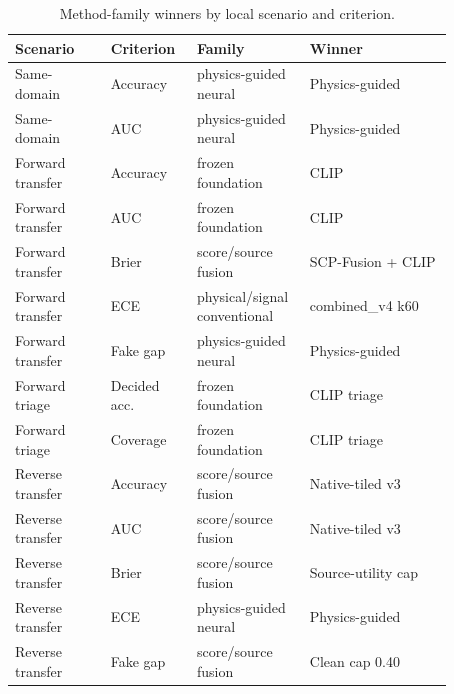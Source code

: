 \begin{table}[t]
\centering
\small
\caption{Method-family winners by local scenario and criterion.}
\label{tab:method-family-comparison}
\begin{tabular}{p{0.20\linewidth} p{0.18\linewidth} p{0.19\linewidth} p{0.30\linewidth}}
\toprule
Scenario & Criterion & Family & Winner \\
\midrule
Same-domain & Accuracy & physics-guided neural & Physics-guided \\
Same-domain & AUC & physics-guided neural & Physics-guided \\
Forward transfer & Accuracy & frozen foundation & CLIP \\
Forward transfer & AUC & frozen foundation & CLIP \\
Forward transfer & Brier & score/source fusion & SCP-Fusion + CLIP \\
Forward transfer & ECE & physical/signal conventional & combined\_v4 k60 \\
Forward transfer & Fake gap & physics-guided neural & Physics-guided \\
Forward triage & Decided acc. & frozen foundation & CLIP triage \\
Forward triage & Coverage & frozen foundation & CLIP triage \\
Reverse transfer & Accuracy & score/source fusion & Native-tiled v3 \\
Reverse transfer & AUC & score/source fusion & Native-tiled v3 \\
Reverse transfer & Brier & score/source fusion & Source-utility cap \\
Reverse transfer & ECE & physics-guided neural & Physics-guided \\
Reverse transfer & Fake gap & score/source fusion & Clean cap 0.40 \\
\bottomrule
\end{tabular}
\end{table}
